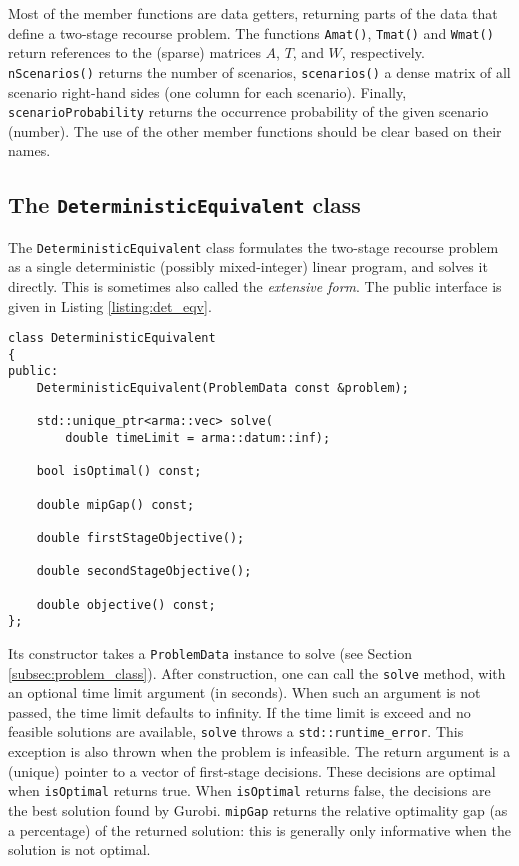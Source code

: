 \documentclass[12pt, english]{article}
\begin{document}
Most of the member functions are data getters, returning parts of the data that define a two-stage recourse problem. The functions \texttt{Amat()}, \texttt{Tmat()} and \texttt{Wmat()} return references to the (sparse) matrices $A$, $T$, and $W$, respectively. \texttt{nScenarios()} returns the number of scenarios, \texttt{scenarios()} a dense matrix of all scenario right-hand sides (one column for each scenario). Finally, \texttt{scenarioProbability} returns the occurrence probability of the given scenario (number). The use of the other member functions should be clear based on their names.

\subsection{The \texttt{DeterministicEquivalent} class}
\label{subsec:det_eqv_class}

The \texttt{DeterministicEquivalent} class formulates the two-stage recourse problem as a single deterministic (possibly mixed-integer) linear program, and solves it directly. This is sometimes also called the \textit{extensive form}. The public interface is given in Listing \ref{listing:det_eqv}.
\begin{lstlisting}[caption={Public interface of the \texttt{DeterministicEquivalent} class.},
                   label={listing:det_eqv}]
class DeterministicEquivalent
{
public:
	DeterministicEquivalent(ProblemData const &problem);
	
	std::unique_ptr<arma::vec> solve(
		double timeLimit = arma::datum::inf);
	
	bool isOptimal() const;
	
	double mipGap() const;
	
	double firstStageObjective();
	
	double secondStageObjective();
	
	double objective() const;
};
\end{lstlisting}
Its constructor takes a \texttt{ProblemData} instance to solve (see Section \ref{subsec:problem_class}). After construction, one can call the \texttt{solve} method, with an optional time limit argument (in seconds). When such an argument is not passed, the time limit defaults to infinity. If the time limit is exceed and no feasible solutions are available, \texttt{solve} throws a \texttt{std::runtime\_error}. This exception is also thrown when the problem is infeasible. The return argument is a (unique) pointer to a vector of first-stage decisions. These decisions are optimal when \texttt{isOptimal} returns true. When \texttt{isOptimal} returns false, the decisions are the best solution found by Gurobi. \texttt{mipGap} returns the relative optimality gap (as a percentage) of the returned solution: this is generally only informative when the solution is not optimal.
\end{document}

